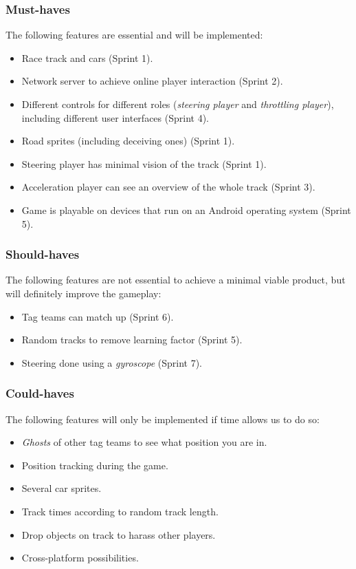 \documentclass[11pt,twoside,a4paper]{article}
\begin{document}
\subsubsection{Must-haves}
The following features are essential and will be implemented:

\begin{itemize}
	\item Race track and cars (Sprint 1).
	\item Network server to achieve online player interaction (Sprint 2).
	\item Different controls for different roles (\emph{steering player} and \emph{throttling player}), including different user interfaces (Sprint 4).
	\item Road sprites (including deceiving ones) (Sprint 1).
  \item Steering player has minimal vision of the track (Sprint 1).
  \item Acceleration player can see an overview of the whole track (Sprint 3).
  \item Game is playable on devices that run on an Android operating system (Sprint 5).
\end{itemize}


\subsubsection{Should-haves}
The following features are not essential to achieve a minimal viable product, but will definitely improve the gameplay:

\begin{itemize}
  \item Tag teams can match up (Sprint 6).
  \item Random tracks to remove learning factor (Sprint 5).
  \item Steering done using a \emph{gyroscope} (Sprint 7).
\end{itemize}


\subsubsection{Could-haves}
The following features will only be implemented if time allows us to do so:

\begin{itemize}
  \item \emph{Ghosts} of other tag teams to see what position you are in.
  \item Position tracking during the game.
  \item Several car sprites.
  \item Track times according to random track length.
  \item Drop objects on track to harass other players.
	\item Cross-platform possibilities.
\end{itemize}
\end{document}
